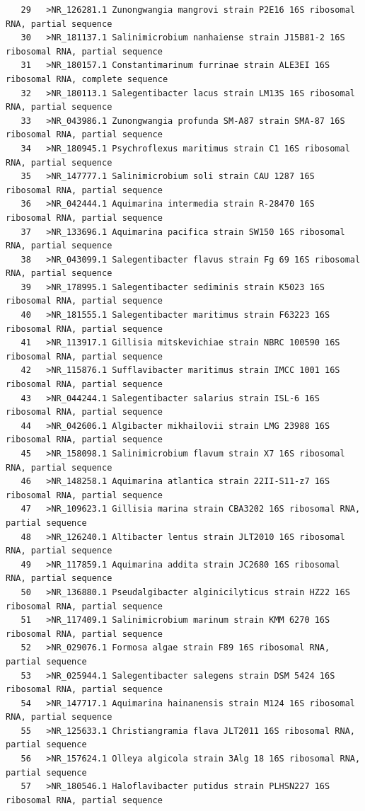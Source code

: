 \documentclass{article}
\begin{document}
\begin{verbatim}
   29	>NR_126281.1 Zunongwangia mangrovi strain P2E16 16S ribosomal RNA, partial sequence
   30	>NR_181137.1 Salinimicrobium nanhaiense strain J15B81-2 16S ribosomal RNA, partial sequence
   31	>NR_180157.1 Constantimarinum furrinae strain ALE3EI 16S ribosomal RNA, complete sequence
   32	>NR_180113.1 Salegentibacter lacus strain LM13S 16S ribosomal RNA, partial sequence
   33	>NR_043986.1 Zunongwangia profunda SM-A87 strain SMA-87 16S ribosomal RNA, partial sequence
   34	>NR_180945.1 Psychroflexus maritimus strain C1 16S ribosomal RNA, partial sequence
   35	>NR_147777.1 Salinimicrobium soli strain CAU 1287 16S ribosomal RNA, partial sequence
   36	>NR_042444.1 Aquimarina intermedia strain R-28470 16S ribosomal RNA, partial sequence
   37	>NR_133696.1 Aquimarina pacifica strain SW150 16S ribosomal RNA, partial sequence
   38	>NR_043099.1 Salegentibacter flavus strain Fg 69 16S ribosomal RNA, partial sequence
   39	>NR_178995.1 Salegentibacter sediminis strain K5023 16S ribosomal RNA, partial sequence
   40	>NR_181555.1 Salegentibacter maritimus strain F63223 16S ribosomal RNA, partial sequence
   41	>NR_113917.1 Gillisia mitskevichiae strain NBRC 100590 16S ribosomal RNA, partial sequence
   42	>NR_115876.1 Sufflavibacter maritimus strain IMCC 1001 16S ribosomal RNA, partial sequence
   43	>NR_044244.1 Salegentibacter salarius strain ISL-6 16S ribosomal RNA, partial sequence
   44	>NR_042606.1 Algibacter mikhailovii strain LMG 23988 16S ribosomal RNA, partial sequence
   45	>NR_158098.1 Salinimicrobium flavum strain X7 16S ribosomal RNA, partial sequence
   46	>NR_148258.1 Aquimarina atlantica strain 22II-S11-z7 16S ribosomal RNA, partial sequence
   47	>NR_109623.1 Gillisia marina strain CBA3202 16S ribosomal RNA, partial sequence
   48	>NR_126240.1 Altibacter lentus strain JLT2010 16S ribosomal RNA, partial sequence
   49	>NR_117859.1 Aquimarina addita strain JC2680 16S ribosomal RNA, partial sequence
   50	>NR_136880.1 Pseudalgibacter alginicilyticus strain HZ22 16S ribosomal RNA, partial sequence
   51	>NR_117409.1 Salinimicrobium marinum strain KMM 6270 16S ribosomal RNA, partial sequence
   52	>NR_029076.1 Formosa algae strain F89 16S ribosomal RNA, partial sequence
   53	>NR_025944.1 Salegentibacter salegens strain DSM 5424 16S ribosomal RNA, partial sequence
   54	>NR_147717.1 Aquimarina hainanensis strain M124 16S ribosomal RNA, partial sequence
   55	>NR_125633.1 Christiangramia flava JLT2011 16S ribosomal RNA, partial sequence
   56	>NR_157624.1 Olleya algicola strain 3Alg 18 16S ribosomal RNA, partial sequence
   57	>NR_180546.1 Haloflavibacter putidus strain PLHSN227 16S ribosomal RNA, partial sequence

\end{verbatim}
\end{document}
